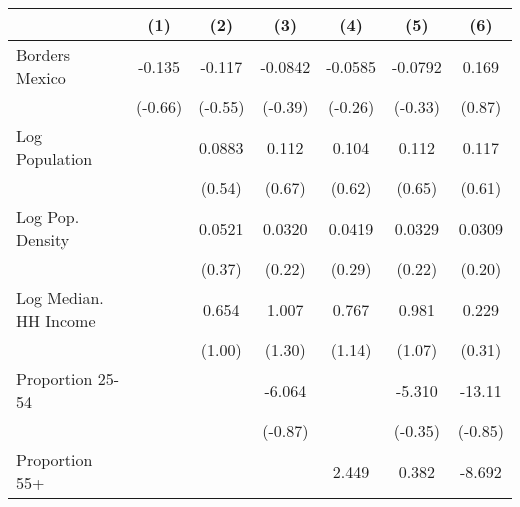 {
\def\sym#1{\ifmmode^{#1}\else\(^{#1}\)\fi}
\begin{tabular}{l*{6}{c}}
\toprule
                    &\multicolumn{1}{c}{(1)}         &\multicolumn{1}{c}{(2)}         &\multicolumn{1}{c}{(3)}         &\multicolumn{1}{c}{(4)}         &\multicolumn{1}{c}{(5)}         &\multicolumn{1}{c}{(6)}         \\
\midrule
Borders Mexico      &      -0.135         &      -0.117         &     -0.0842         &     -0.0585         &     -0.0792         &       0.169         \\
                    &     (-0.66)         &     (-0.55)         &     (-0.39)         &     (-0.26)         &     (-0.33)         &      (0.87)         \\
\addlinespace
Log Population      &                     &      0.0883         &       0.112         &       0.104         &       0.112         &       0.117         \\
                    &                     &      (0.54)         &      (0.67)         &      (0.62)         &      (0.65)         &      (0.61)         \\
\addlinespace
Log Pop. Density    &                     &      0.0521         &      0.0320         &      0.0419         &      0.0329         &      0.0309         \\
                    &                     &      (0.37)         &      (0.22)         &      (0.29)         &      (0.22)         &      (0.20)         \\
\addlinespace
Log Median. HH Income&                     &       0.654         &       1.007         &       0.767         &       0.981         &       0.229         \\
                    &                     &      (1.00)         &      (1.30)         &      (1.14)         &      (1.07)         &      (0.31)         \\
\addlinespace
Proportion 25-54    &                     &                     &      -6.064         &                     &      -5.310         &      -13.11         \\
                    &                     &                     &     (-0.87)         &                     &     (-0.35)         &     (-0.85)         \\
\addlinespace
Proportion 55+      &                     &                     &                     &       2.449         &       0.382         &      -8.692         \\

\end{tabular}}
